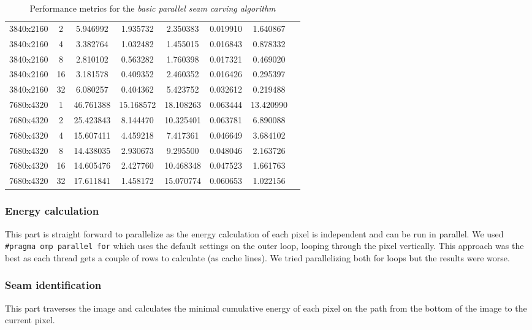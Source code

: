 \documentclass{article}
\begin{document}
\begin{table}[H]
\begin{tabular}{lccccccc}
        3840x2160 & 2  & 5.946992  & 1.935732 & 2.350383 & 0.019910 & 1.640867 \\
        3840x2160 & 4  & 3.382764  & 1.032482 & 1.455015 & 0.016843 & 0.878332 \\
        3840x2160 & 8  & 2.810102  & 0.563282 & 1.760398 & 0.017321 & 0.469020 \\
        3840x2160 & 16 & 3.181578  & 0.409352 & 2.460352 & 0.016426 & 0.295397 \\
        3840x2160 & 32 & 6.080257  & 0.404362 & 5.423752 & 0.032612 & 0.219488 \\
        \midrule
        7680x4320 & 1  & 46.761388 & 15.168572 & 18.108263 & 0.063444 & 13.420990 \\
        7680x4320 & 2  & 25.423843 & 8.144470  & 10.325401 & 0.063781 & 6.890088 \\
        7680x4320 & 4  & 15.607411 & 4.459218  & 7.417361  & 0.046649 & 3.684102 \\
        7680x4320 & 8  & 14.438035 & 2.930673  & 9.295500  & 0.048046 & 2.163726 \\
        7680x4320 & 16 & 14.605476 & 2.427760  & 10.468348 & 0.047523 & 1.661763 \\
        7680x4320 & 32 & 17.611841 & 1.458172  & 15.070774 & 0.060653 & 1.022156 \\
        \bottomrule
    \end{tabular}
    \caption{Performance metrics for the \textit{basic parallel seam carving algorithm}}
    \label{tab:performance_data}
\end{table}

\subsubsection{Energy calculation}
This part is straight forward to parallelize as the energy calculation of each pixel is independent and can be run in parallel. We used \texttt{\#pragma omp parallel for} which uses the default settings on the outer loop, looping through the pixel vertically. This approach was the best as each thread gets a couple of rows to calculate (as cache lines). We tried parallelizing both for loops but the results were worse.

\subsubsection{Seam identification}
This part traverses the image and calculates the minimal cumulative energy of each pixel on the path from the bottom of the image to the current pixel.
\end{document}
